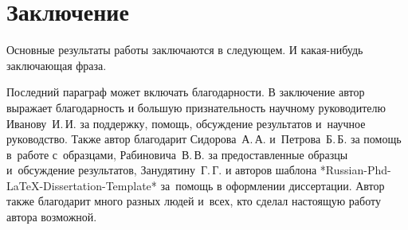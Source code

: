 \chapter*{Заключение}                       %


Основные результаты работы заключаются в следующем.
% 
И какая-нибудь заключающая фраза.

Последний параграф может включать благодарности.  В заключение автор
выражает благодарность и большую признательность научному руководителю
Иванову~И.\,И. за поддержку, помощь, обсуждение результатов и~научное
руководство. Также автор благодарит Сидорова~А.\,А. и~Петрова~Б.\,Б.
за помощь в~работе с~образцами, Рабиновича~В.\,В. за предоставленные
образцы и~обсуждение результатов, Занудятину~Г.\,Г. и авторов шаблона
*Russian-Phd-LaTeX-Dissertation-Template* за~помощь в оформлении
диссертации. Автор также благодарит много разных людей
и~всех, кто сделал настоящую работу автора возможной.